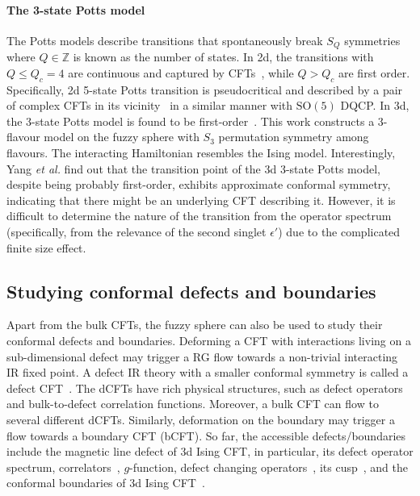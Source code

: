 \documentclass{timesjhep}
\begin{document}
\paragraph{The 3-state Potts model~\cite{Yang2025}}

The Potts models describe transitions that spontaneously break $S_Q$ symmetries where $Q\in\mathbb{Z}$ is known as the number of states. In 2d, the transitions with $Q\leq Q_c=4$ are continuous and captured by CFTs~\cite{Dotsenko1984Potts}, while $Q>Q_c$ are first order. Specifically, 2d 5-state Potts transition is pseudocritical and described by a pair of complex CFTs in its vicinity~\cite{Tang2024Potts} in a similar manner with $\mathrm{SO}(5)$ DQCP. In 3d, the 3-state Potts model is found to be first-order~\cite{Barkema1991Potts,Chester2022Potts}. This work constructs a 3-flavour model on the fuzzy sphere with $S_3$ permutation symmetry among flavours. The interacting Hamiltonian resembles the Ising model. Interestingly, Yang \textit{et al.} find out that the transition point of the 3d 3-state Potts model, despite being probably first-order, exhibits approximate conformal symmetry, indicating that there might be an underlying CFT describing it. However, it is difficult to determine the nature of the transition from the operator spectrum (specifically, from the relevance of the second singlet $\epsilon'$) due to the complicated finite size effect.

\subsection{Studying conformal defects and boundaries}

Apart from the bulk CFTs, the fuzzy sphere can also be used to study their conformal defects and boundaries. Deforming a CFT with interactions living on a sub-dimensional defect may trigger a RG flow towards a non-trivial interacting IR fixed point. A defect IR theory with a smaller conformal symmetry is called a defect CFT~\cite{Billo2013Defect,Billo2016Defect}. The dCFTs have rich physical structures, such as defect operators and bulk-to-defect correlation functions. Moreover, a bulk CFT can flow to several different dCFTs. Similarly, deformation on the boundary may trigger a flow towards a boundary CFT (bCFT). So far, the accessible defects/boundaries include the magnetic line defect of 3d Ising CFT, in particular, its defect operator spectrum, correlators~\cite{Hu2023Aug}, $g$-function, defect changing operators~\cite{Zhou2024Jul}, its cusp~\cite{Cuomo2024}, and the conformal boundaries of 3d Ising CFT~\cite{Zhou2024Jul,Dedushenko2024}. 
\end{document}
